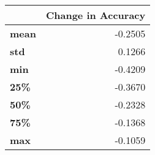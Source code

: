 \begin{tabular}{lr}
\toprule
{} &  Change in Accuracy \\
\midrule
\textbf{mean} &             -0.2505 \\
\textbf{std } &              0.1266 \\
\textbf{min } &             -0.4209 \\
\textbf{25\% } &             -0.3670 \\
\textbf{50\% } &             -0.2328 \\
\textbf{75\% } &             -0.1368 \\
\textbf{max } &             -0.1059 \\
\bottomrule
\end{tabular}
